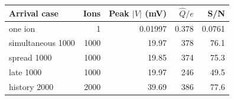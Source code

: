 \begin{tabular}{lrrrr}
\toprule
Arrival case & Ions & Peak $|V|$ (mV) & $\widehat Q/e$ & S/N \\
\midrule
one ion & 1 & 0.01997 & 0.378 & 0.0761 \\
simultaneous 1000 & 1000 & 19.97 & 378 & 76.1 \\
spread 1000 & 1000 & 19.85 & 374 & 75.3 \\
late 1000 & 1000 & 19.97 & 246 & 49.5 \\
history 2000 & 2000 & 39.69 & 386 & 77.6 \\
\bottomrule
\end{tabular}
